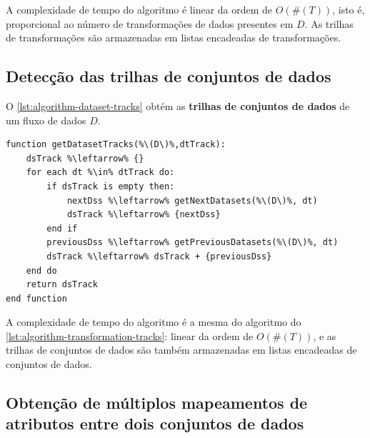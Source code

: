 A complexidade de tempo do algoritmo é linear da ordem de \( O(\#(T)) \), isto é, proporcional ao número de transformações de dados presentes em \( D \). As trilhas de transformações são armazenadas em listas encadeadas de transformações.

\subsection{Detecção das trilhas de conjuntos de dados}

O \autoref{lst:algorithm-dataset-tracks} obtém as \textbf{trilhas de conjuntos de dados} de um fluxo de dados \( D \).


\begin{minipage}[c]{0.95\textwidth}
\begin{lstlisting}[language=pseudocode,label={lst:algorithm-dataset-tracks},caption={[Detecção das trilhas de conjuntos de dados]Detecção do rastro do fluxo de dados no nível de trilhas de conjuntos de dados.}]
function getDatasetTracks(%\(D\)%,dtTrack):
    dsTrack %\leftarrow% {}
    for each dt %\in% dtTrack do:
        if dsTrack is empty then:
            nextDss %\leftarrow% getNextDatasets(%\(D\)%, dt)
            dsTrack %\leftarrow% {nextDss}
        end if
        previousDss %\leftarrow% getPreviousDatasets(%\(D\)%, dt)
        dsTrack %\leftarrow% dsTrack + {previousDss}
    end do
    return dsTrack
end function
\end{lstlisting}
\end{minipage}

A complexidade de tempo do algoritmo é a mesma do algoritmo do \autoref{lst:algorithm-transformation-tracks}: linear da ordem de \( O(\#(T)) \), e as trilhas de conjuntos de dados são também armazenadas em listas encadeadas de conjuntos de dados.

\subsection{Obtenção de múltiplos mapeamentos de atributos entre dois conjuntos de dados}


